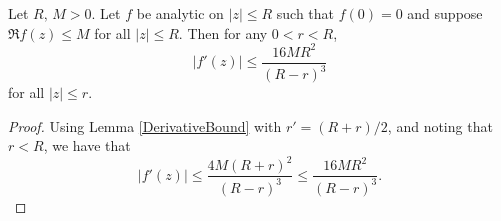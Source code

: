 \begin{theorem}[BorelCaratheodoryDeriv]
\label{BorelCaratheodoryDeriv}
\leanok
Let $R,\,M>0$. Let $f$ be analytic on $|z|\leq R$ such that $f(0)=0$ and suppose
    $\Re f(z)\leq M$ for all $|z|\leq R$. Then for any $0 < r < R$,
    $$|f'(z)|\leq\frac{16MR^2}{(R-r)^3}$$
    for all $|z|\leq r$.
\end{theorem}
\begin{proof}
\leanok
Using Lemma \ref{DerivativeBound} with $r'=(R+r)/2$, and noting that $r < R$,
    we have that
    $$|f'(z)|\leq\frac{4M(R+r)^2}{(R-r)^3}\leq\frac{16MR^2}{(R-r)^3}.$$
\end{proof}
